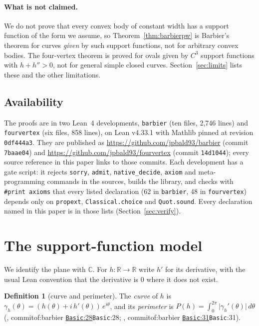 \documentclass[11pt]{article}
\theoremstyle{definition}
\newtheorem{definition}[theorem]{Definition}
\theoremstyle{remark}
\newcommand{\lean}[1]{\texttt{#1}}
\newcommand{\RR}{\mathbb{R}}
\newcommand{\CC}{\mathbb{C}}
\newcommand{\commitof}[1]{\csname commitof:#1\endcsname}
\newcommand{\repo}[1]{https://github.com/jpbald93/#1}
\newcommand{\src}[4]{\ifcsname commitof:#1\endcsname
  \href{\repo{#1}/blob/\commitof{#1}/#2/#3.lean\#L#4}{\texttt{#3}:#4}\else\texttt{#3}:#4\fi}
\begin{document}
\paragraph{What is not claimed.} We do not prove that every convex body of constant width has a
support function of the form we assume, so Theorem~\ref{thm:barbierpw} is Barbier's theorem for
curves \emph{given} by such support functions, not for arbitrary convex bodies. The four-vertex
theorem is proved for ovals given by $C^3$ support functions with $h+h''>0$, not for general
simple closed curves. Section~\ref{sec:limits} lists these and the other limitations.

\subsection{Availability}\label{sec:avail}
The proofs are in two Lean~4 developments, \lean{barbier} (ten files, 2{,}746 lines) and
\lean{fourvertex} (six files, 858 lines), on Lean v4.33.1 \cite{lean4} with Mathlib \cite{mathlib2020} pinned at revision
\texttt{0df444a3}. They are published as \url{https://github.com/jpbald93/barbier} (commit
\texttt{7baae04}) and \url{https://github.com/jpbald93/fourvertex} (commit \texttt{14d1044}); every
source reference in this paper links to those commits. Each development has a gate script: it rejects \lean{sorry}, \lean{admit},
\lean{native\_decide}, \lean{axiom} and meta-programming commands in the sources, builds the library,
and checks with \lean{\#print axioms} that every listed declaration (62 in \lean{barbier}, 48 in
\lean{fourvertex}) depends only on \lean{propext}, \lean{Classical.choice} and \lean{Quot.sound}.
Every declaration named in this paper is in those lists (Section~\ref{sec:verify}).

\section{The support-function model}\label{sec:model}

We identify the plane with $\CC$. For $h:\RR\to\RR$ write $h'$ for its derivative, with the usual
Lean convention that the derivative is $0$ where it does not exist.

\begin{definition}[curve and perimeter]\label{def:curve}
The \emph{curve} of $h$ is $\gamma_h(\theta) = (h(\theta) + i\,h'(\theta))\,e^{i\theta}$, and its
\emph{perimeter} is $P(h) = \int_0^{2\pi}\lvert\gamma_h'(\theta)\rvert\,d\theta$
(, \src{barbier}{Barbier}{Basic}{28}; , \src{barbier}{Barbier}{Basic}{31}).
\end{definition}
\end{document}
